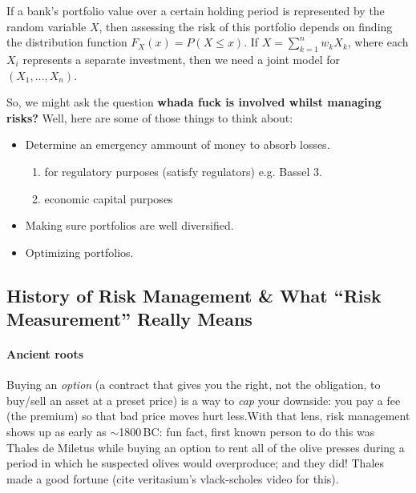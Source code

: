  \begin{remark}
    If a bank's portfolio value over a certain holding period is represented by the random variable $X$, then assessing the risk of this portfolio depends on finding the
    distribution function $F_X (x) = P(X \leq x)$. If $X = \sum_{k=1}^{n}w_kX_k$, where each $X_i$ represents a separate investment, then we need 
    a joint model for $(X_1,\ldots, X_n)$.
 \end{remark}

\vspace{0.2cm}

So, we might ask the question \textbf{whada fuck is involved whilst managing risks?} Well, here are some of those things to think about:
\begin{itemize}
    \item Determine an emergency ammount of money to absorb losses.
    \begin{enumerate}
        \item for regulatory purposes (satisfy regulators) e.g. Bassel 3.
        \item economic capital purposes
    \end{enumerate}
    \item Making sure portfolios are well diversified.
    \item Optimizing portfolios.
\end{itemize}

\subsection*{History of Risk Management \& What ``Risk Measurement'' Really Means}

\paragraph{Ancient roots}
Buying an \emph{option} (a contract that gives you the right, not the obligation, to buy/sell an asset at a preset price) is a way to \emph{cap} your downside: you pay a fee (the premium) so that bad price moves hurt less.\;With that lens, risk management shows up as early as \(\sim\)1800\,BC: fun fact, first known person to do this was Thales de Miletus while buying an option to rent all of the olive presses during a period in which he suspected olives would overproduce; and they did! Thales made a good fortune (cite veritasium's vlack-scholes video for this).

